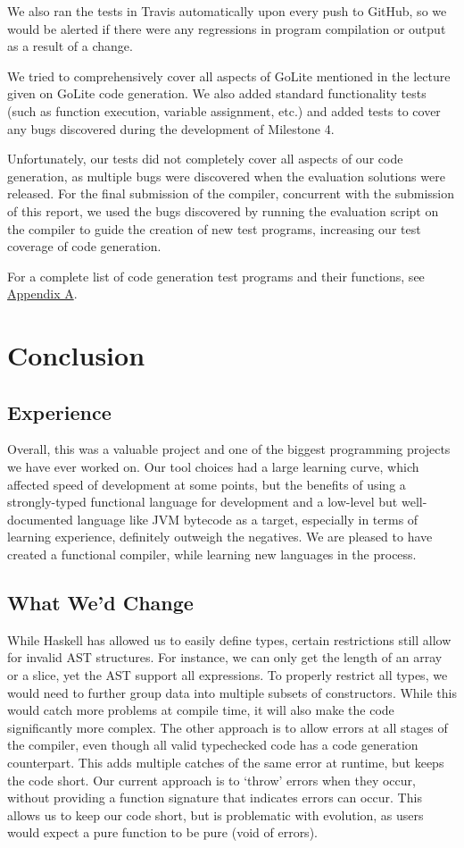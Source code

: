 \documentclass[11pt]{article}
\begin{document}
We also ran the tests in Travis automatically upon every push to GitHub,
so we would be alerted if there were any regressions in program compilation
or output as a result of a change.

We tried to comprehensively cover all aspects of GoLite mentioned in the
lecture given on GoLite code generation. We also added standard functionality
tests (such as function execution, variable assignment, etc.) and added tests
to cover any bugs discovered during the development of Milestone 4.

Unfortunately, our tests did not completely cover all aspects of our code
generation, as multiple bugs were discovered when the evaluation solutions
were released. For the final submission of the compiler, concurrent with the
submission of this report, we used the bugs discovered by running the evaluation
script on the compiler to guide the creation of new test programs, increasing our
test coverage of code generation.

For a complete list of code generation test programs and their functions, see
\hyperref[sec:appendixa]{Appendix A}.

\section{Conclusion}
\subsection{Experience}
Overall, this was a valuable project and one of the biggest programming projects
we have ever worked on. Our tool choices had a large learning curve, which
affected speed of development at some points, but the benefits of using a
strongly-typed functional language for development and a low-level but
well-documented language like JVM bytecode as a target, especially in terms of
learning experience, definitely outweigh the negatives.
We are pleased to have created a functional compiler, while learning new languages in the process.

\subsection{What We'd Change}

While Haskell has allowed us to easily define types, certain
restrictions still allow for invalid AST structures.  For instance, we
can only get the length of an array or a slice, yet the AST support
all expressions.  To properly restrict all types, we would need to
further group data into multiple subsets of constructors\cite{so:pattern/matching/subset}.  While this
would catch more problems at compile time, it will also make the code
significantly more complex.  The other approach is to allow errors at
all stages of the compiler, even though all valid typechecked code has
a code generation counterpart.  This adds multiple catches of the same error
at runtime, but keeps the code short.  Our current approach is to
`throw' errors when they occur, without providing a function signature
that indicates errors can occur.  This allows us to keep our code
short, but is problematic with evolution, as users would expect a pure
function to be pure (void of errors).
\end{document}
